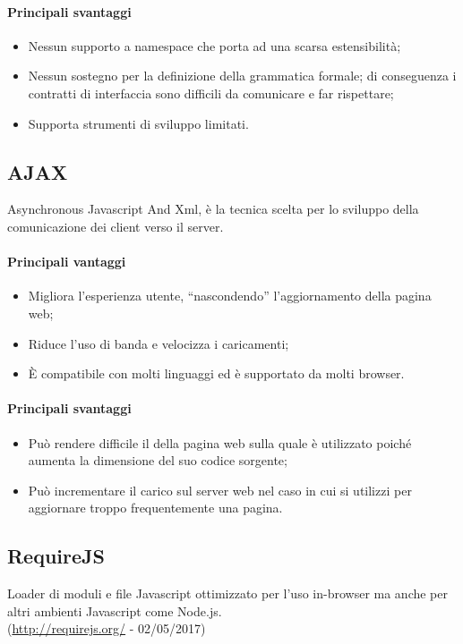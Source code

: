 \documentclass[../PianoDiQualifica.tex]{subfiles}
\begin{document}
			\paragraph{Principali svantaggi}
				\begin{itemize}
					\item Nessun supporto a namespace che porta ad una scarsa estensibilità;
					\item Nessun sostegno per la definizione della grammatica formale; di conseguenza
					i contratti di interfaccia sono difficili da comunicare e far rispettare;
					\item Supporta strumenti di sviluppo limitati.
				\end{itemize}
		\subsection{AJAX}
			Asynchronous Javascript And Xml, è la tecnica scelta per lo sviluppo della comunicazione
			dei client verso il server.
			\paragraph{Principali vantaggi}
			\begin{itemize}
					\item Migliora l'esperienza utente, ``nascondendo'' l'aggiornamento della
					pagina web;
					\item Riduce l'uso di banda e velocizza i caricamenti;
					\item È compatibile con molti linguaggi ed è supportato da molti browser.
				\end{itemize}
			\paragraph{Principali svantaggi}
				\begin{itemize}
					\item Può rendere difficile il  della pagina web sulla quale è utilizzato
					poiché aumenta la dimensione del suo codice sorgente;
					\item Può incrementare il carico sul server web nel caso in cui si utilizzi per
					aggiornare troppo frequentemente una pagina.
				\end{itemize}
		\subsection{RequireJS}
			Loader di moduli e file Javascript ottimizzato per l'uso in-browser ma anche per altri
			ambienti Javascript come Node.js.\\
			(\url{http://requirejs.org/} - 02/05/2017)
\end{document}
